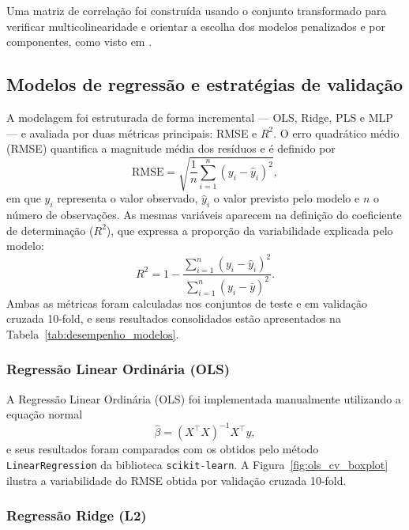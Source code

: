 Uma matriz de correlação foi construída usando o conjunto transformado para verificar multicolinearidade e orientar a escolha dos modelos penalizados e por componentes, como visto em \cite{Souza2025EDA}.

\subsection{Modelos de regressão e estratégias de validação}
\label{subsec:modelos}

A modelagem foi estruturada de forma incremental — OLS, Ridge, PLS e MLP — e avaliada por duas métricas principais: RMSE e $R^{2}$. O erro quadrático médio (RMSE) quantifica a magnitude média dos resíduos e é definido por
\begin{equation}
\text{RMSE} = \sqrt{\frac{1}{n} \sum_{i=1}^{n} (y_i - \hat{y}_i)^2},
\end{equation}
em que $y_i$ representa o valor observado, $\hat{y}_i$ o valor previsto pelo modelo e $n$ o número de observações. As mesmas variáveis aparecem na definição do coeficiente de determinação ($R^{2}$), que expressa a proporção da variabilidade explicada pelo modelo:
\begin{equation}
R^2 = 1 - \frac{\sum_{i=1}^{n} (y_i - \hat{y}_i)^2}{\sum_{i=1}^{n} (y_i - \bar{y})^2}.
\end{equation}
Ambas as métricas foram calculadas nos conjuntos de teste e em validação cruzada 10-fold, e seus resultados consolidados estão apresentados na Tabela~\ref{tab:desempenho_modelos}.


\subsubsection{Regressão Linear Ordinária (OLS)}


A Regressão Linear Ordinária (OLS) foi implementada manualmente utilizando a equação normal
\begin{equation}
    \hat{\beta} = (X^\top X)^{-1} X^\top y,
\end{equation}
e seus resultados foram comparados com os obtidos pelo método \texttt{LinearRegression} da biblioteca \texttt{scikit-learn}. A Figura~\ref{fig:ols_cv_boxplot} ilustra a variabilidade do RMSE obtida por validação cruzada 10-fold.

\subsubsection{Regressão Ridge (L2)}

